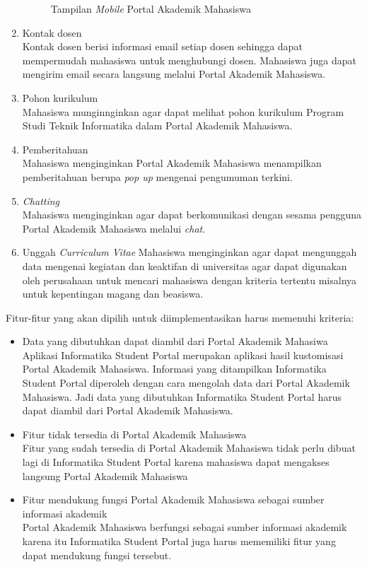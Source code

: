 \begin{enumerate}
\begin{figure}[H]
			\caption{Tampilan \textit{Mobile} Portal Akademik Mahasiswa} 
			\label{fig:3_pam_mobile}
		\end{figure}
	\item Kontak dosen\\
	Kontak dosen berisi informasi email setiap dosen sehingga dapat mempermudah mahasiswa untuk menghubungi dosen. Mahasiswa juga dapat mengirim email secara langsung melalui Portal Akademik Mahasiswa.
	\item Pohon kurikulum\\
	Mahasiswa munginnginkan agar dapat melihat pohon kurikulum Program Studi Teknik Informatika dalam Portal Akademik Mahasiswa.
	\item Pemberitahuan\\
	Mahasiswa menginginkan Portal Akademik Mahasiswa menampilkan pemberitahuan berupa \textit{pop up} mengenai pengumuman terkini.
	\item \textit{Chatting}\\
	Mahasiswa menginginkan agar dapat berkomunikasi dengan sesama pengguna Portal Akademik Mahasiswa melalui \textit{chat}.
	\item Unggah \textit{Curriculum Vitae}
	Mahasiswa menginginkan agar dapat mengunggah data mengenai kegiatan dan keaktifan di universitas agar dapat digunakan oleh perusahaan untuk mencari mahasiswa dengan kriteria tertentu misalnya untuk kepentingan magang dan beasiswa.
\end{enumerate}

Fitur-fitur yang akan dipilih untuk diimplementasikan harus memenuhi kriteria:
\begin{itemize}
	\item Data yang dibutuhkan dapat diambil dari Portal Akademik Mahasiwa \\
	Aplikasi Informatika Student Portal merupakan aplikasi hasil kustomisasi Portal Akademik Mahasiswa. Informasi yang ditampilkan Informatika Student Portal diperoleh dengan cara mengolah data dari Portal Akademik Mahasiswa. Jadi data yang dibutuhkan Informatika Student Portal harus dapat diambil dari Portal Akademik Mahasiswa. 
	\item Fitur tidak tersedia di Portal Akademik Mahasiswa\\
	Fitur yang sudah tersedia di Portal Akademik Mahasiswa tidak perlu dibuat lagi di Informatika Student Portal karena mahasiswa dapat mengakses langsung Portal Akademik Mahasiswa
	\item Fitur mendukung fungsi Portal Akademik Mahasiswa sebagai sumber informasi akademik \\
	Portal Akademik Mahasiswa berfungsi sebagai sumber informasi akademik karena itu Informatika Student Portal juga harus mememiliki fitur yang dapat mendukung fungsi tersebut.
\end{itemize}

